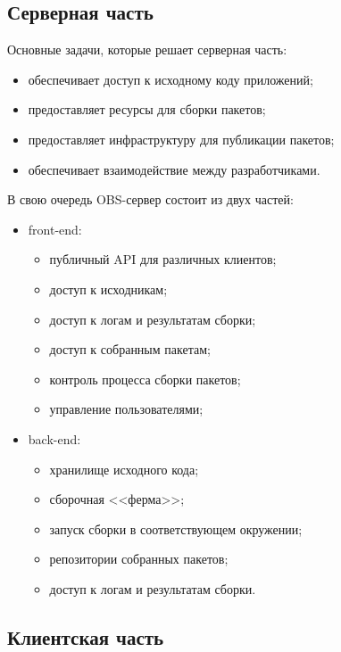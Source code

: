 \documentclass[10pt, a5paper]{article}
\begin{document}
\subsection*{Серверная часть}

Основные задачи, которые решает серверная часть:

\begin{itemize}
  \item обеспечивает доступ к исходному коду приложений;
  \item предоставляет ресурсы для сборки пакетов;
  \item предоставляет инфраструктуру для публикации пакетов;
  \item обеспечивает взаимодействие между разработчиками.
\end{itemize}

В свою очередь OBS-сервер состоит из двух частей:

\begin{itemize}
  \item front-end:
    \begin{itemize}
      \item публичный API для различных клиентов;
      \item доступ к исходникам;
      \item доступ к логам и результатам сборки;
      \item доступ к собранным пакетам;
      \item контроль процесса сборки пакетов;
      \item управление пользователями;
    \end{itemize}


  \item back-end:
    \begin{itemize}
      \item хранилище исходного кода;
      \item сборочная <<ферма>>;
      \item запуск сборки в соответствующем окружении;
      \item репозитории собранных пакетов;
      \item доступ к логам и результатам сборки.
    \end{itemize}


\end{itemize}

\subsection*{Клиентская часть}
\end{document}
